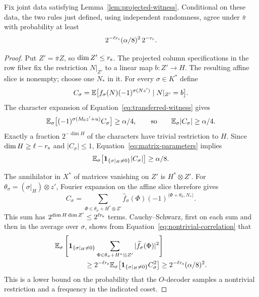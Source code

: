 \begin{lemma}
\label{lem:fourier-coset-decoding}
Fix joint data satisfying Lemma~\ref{lem:projected-witness}.  Conditional
on these data, the two rules just defined, using independent randomness,
agree under $\bar\pi$ with probability at least
\begin{equation}
 2^{-\ell r_{\rm s}}(\alpha/8)^2\,2^{-r_{\rm s}}.
 \label{eq:conditional-decoding}
\end{equation}
\end{lemma}

\begin{proof}
Put $Z'=\bar\pi Z$, so $\dim Z'\le r_{\rm s}$.  The projected column
specifications in the row fiber fix the restriction $N|_{Z'}$ to a linear
map $b:Z'\to H$.  The resulting affine slice is nonempty; choose one
$N_*$ in it.  For every $\sigma\in K^*$ define
\[
 C_\sigma=\mathbb E\bigl[f_\sigma(N)(-1)^{\sigma(Nz')}
                       \mid N|_{Z'}=b\bigr].
\]
The character expansion of Equation~\eqref{eq:transferred-witness} gives
\[
 \mathbb E_\sigma\bigl[(-1)^{\sigma(M_0z'+u)}C_\sigma\bigr]
 \ge\alpha/4,
 \qquad\text{so}\qquad
 \mathbb E_\sigma|C_\sigma|\ge\alpha/4.
\]
Exactly a fraction $2^{-\dim H}$ of the characters have trivial
restriction to $H$.  Since $\dim H\ge\ell-r_{\rm s}$ and
$|C_\sigma|\le1$, Equation~\eqref{eq:matrix-parameters} implies
\begin{equation}
 \mathbb E_\sigma\bigl[\mathbf 1_{\{\sigma|_H\ne0\}}|C_\sigma|\bigr]
 \ge\alpha/8.
 \label{eq:nontrivial-correlation}
\end{equation}

The annihilator in $X^*$ of matrices vanishing on $Z'$ is $H^*\otimes Z'$.
For $\theta_\sigma=(\sigma|_H)\otimes z'$, Fourier expansion on the
affine slice therefore gives
\[
 C_\sigma
 =\sum_{\Phi\in\theta_\sigma+H^*\otimes Z'}
       \widehat f_\sigma(\Phi)
       (-1)^{\langle\Phi+\theta_\sigma,N_*\rangle}.
\]
This sum has $2^{\dim H\dim Z'}\le2^{\ell r_{\rm s}}$ terms.
Cauchy--Schwarz, first on each sum and then in the average over $\sigma$,
shows from Equation~\eqref{eq:nontrivial-correlation} that
\begin{align*}
 &\E_\sigma\left[
   \mathbf 1_{\{\sigma|_H\ne0\}}
   \sum_{\Phi\in\theta_\sigma+H^*\otimes Z'}
             |\widehat f_\sigma(\Phi)|^2\right]\\
 &\hspace{15mm}\ge
 2^{-\ell r_{\rm s}}
 \E_\sigma\bigl[\mathbf 1_{\{\sigma|_H\ne0\}}C_\sigma^2\bigr]
 \ge 2^{-\ell r_{\rm s}}(\alpha/8)^2.
\end{align*}
This is a lower bound on the probability that the $O$-decoder samples a
nontrivial restriction and a frequency in the indicated coset.


\end{proof}
